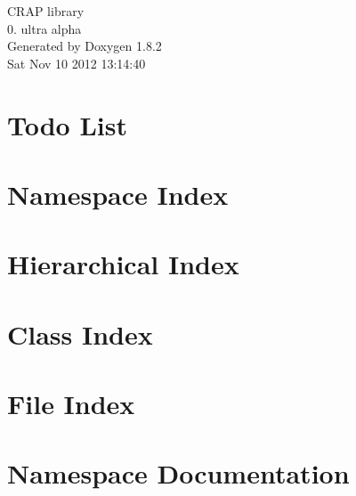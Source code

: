 \documentclass{book}
\begin{document}
\hypersetup{pageanchor=false,citecolor=blue}
\begin{titlepage}
\vspace*{7cm}
\begin{center}
{\Large C\-R\-A\-P library \\[1ex]\large 0. ultra alpha }\\
\vspace*{1cm}
{\large Generated by Doxygen 1.8.2}\\
\vspace*{0.5cm}
{\small Sat Nov 10 2012 13:14:40}\\
\end{center}
\end{titlepage}
\clearemptydoublepage
{}
\tableofcontents
\clearemptydoublepage
{}
\hypersetup{pageanchor=true,citecolor=blue}
\chapter{Todo List}
\label{todo}
\hypertarget{todo}{}

\chapter{Namespace Index}

\chapter{Hierarchical Index}

\chapter{Class Index}

\chapter{File Index}

\chapter{Namespace Documentation}

\end{document}

